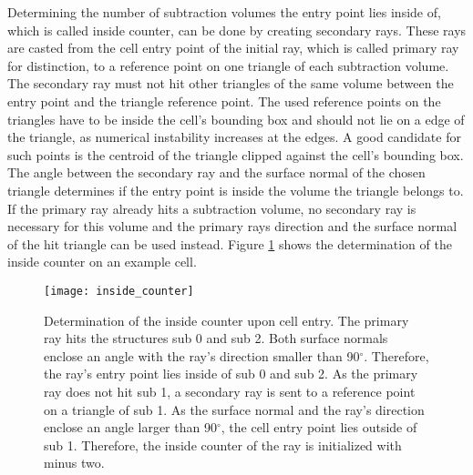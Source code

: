 Determining the number of subtraction volumes the entry point lies inside of, which is called inside counter, can be done by creating secondary rays. These rays are casted from the cell entry point of the initial ray, which is called primary ray for distinction, to a reference point on one triangle of each subtraction volume. The secondary ray must not hit other triangles of the same volume between the entry point and the triangle reference point. The used reference points on the triangles have to be inside the cell's bounding box and should not lie on a edge of the triangle, as numerical instability increases at the edges. A good candidate for such points is the centroid of the triangle clipped against the cell's bounding box. The angle between the secondary ray and the surface normal of the chosen triangle determines if the entry point is inside the volume the triangle belongs to. If the primary ray already hits a subtraction volume, no secondary ray is necessary for this volume and the primary rays direction and the surface normal of the hit triangle can be used instead. Figure \ref{fig:inside_counter} shows the determination of the inside counter on an example cell.

\begin{figure}[h]
\centering
\texttt{[image: inside\_counter]}
\caption[Determination of the inside counter upon cell entry.]{Determination of the inside counter upon cell entry. The primary ray hits the structures sub 0 and sub 2. Both surface normals enclose an angle with the ray's direction smaller than 90$^\circ$. Therefore, the ray's entry point lies inside of sub 0 and sub 2. As the primary ray does not hit sub 1, a secondary ray is sent to a reference point on a triangle of sub 1. As the surface normal and the ray's direction enclose an angle larger than 90$^\circ$, the cell entry point lies outside of sub 1. Therefore, the inside counter of the ray is initialized with minus two.}
\label{fig:inside_counter}
\end{figure}
